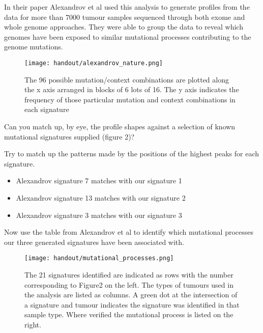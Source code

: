 In their paper Alexandrov et al used this analysis to generate profiles from the data for
more than 7000 tumour samples sequenced through both exome and whole genome approaches.
They were able to group the data to reveal which genomes have been exposed to similar
mutational processes contributing to the genome mutations.

\begin{figure}[H]
\centering
\texttt{[image: handout/alexandrov\_nature.png]}
\caption{The 96 possible mutation/context combinations are plotted along the x axis
arranged in blocks of 6 lots of 16. The y axis indicates the frequency
of those particular mutation and context combinations in each signature}
\label{Figure 2. 21 signature patterns identified from the analysis of more
than 7000 different tumours from Alexandrov et al. Nature 2013.}
\end{figure}

\begin{questions}
Can you match up, by eye, the profile shapes against a selection of known
mutational signatures supplied (figure 2)?

Try to match up the patterns made by the positions of the highest peaks for each signature.
\end{questions}

\begin{answer}
\begin{itemize}
\item Alexandrov signature 7 matches with our signature 1
\item Alexandrov signature 13 matches with our signature 2
\item Alexandrov signature 3 matches with our signature 3
\end{itemize}
\end{answer}

Now use the table from Alexandrov et al to identify which mutational
processes our three generated signatures have been associated with.

\begin{figure}[H]
\centering
\texttt{[image: handout/mutational\_processes.png]}
\caption{The 21 signatures identified are indicated as rows with the number corresponding to Figure2 on the left. The types of tumours used in the analysis are listed as columns. A green dot at the intersection of a signature and tumour indicates the signature was identified in that sample type. Where verified the mutational process is listed on the right.}
\label{Figure 3 Table indicating the probable association of the identified signatures with mutational processes and the origin site of the cancer samples from Alexandrov et al. Nature 2013.}
\end{figure}

